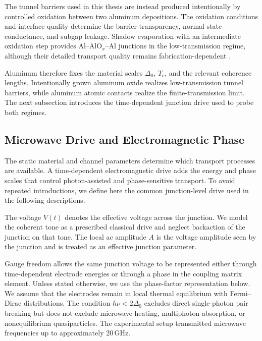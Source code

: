             The tunnel barriers used in this thesis are instead produced intentionally by controlled oxidation between two aluminum depositions. The oxidation conditions and interface quality determine the barrier transparency, normal-state conductance, and subgap leakage. Shadow evaporation with an intermediate oxidation step provides Al--AlO$_x$--Al junctions in the low-transmission regime, although their detailed transport quality remains fabrication-dependent \cite{niemeyer_observation_1976,dolan_offset_1977,sprenger_interplay_2019,sobral-rey_interplay_2022}.

            Aluminum therefore fixes the material scales $\Delta_0$, $T_\mathrm{c}$, and the relevant coherence lengths. Intentionally grown aluminum oxide realizes low-transmission tunnel barriers, while aluminum atomic contacts realize the finite-transmission limit. The next subsection introduces the time-dependent junction drive used to probe both regimes.
        
    \newpage
    \subsection{Microwave Drive and Electromagnetic Phase}
    \label{subsec:platform:microwave}

        The static material and channel parameters determine which transport processes are available. A time-dependent electromagnetic drive adds the energy and phase scales that control photon-assisted and phase-sensitive transport. To avoid repeated introductions, we define here the common junction-level drive used in the following descriptions.

        The voltage $V(t)$ denotes the effective voltage across the junction. We model the coherent tone as a prescribed classical drive and neglect backaction of the junction on that tone. The local ac amplitude $A$ is the voltage amplitude seen by the junction and is treated as an effective junction parameter.

        Gauge freedom allows the same junction voltage to be represented either through time-dependent electrode energies or through a phase in the coupling matrix element. Unless stated otherwise, we use the phase-factor representation below. We assume that the electrodes remain in local thermal equilibrium with Fermi--Dirac distributions. The condition $h\nu < 2\Delta_0$ excludes direct single-photon pair breaking but does not exclude microwave heating, multiphoton absorption, or nonequilibrium quasiparticles. The experimental setup transmitted microwave frequencies up to approximately $20\,\mathrm{GHz}$. \cite{josephson_possible_1962,shapiro_josephson_1963,tien_multiphoton_1963,werthamer_temperature_1966}

